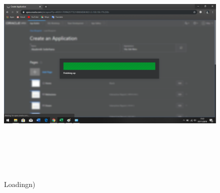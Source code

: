\documentclass[a4, 13pt]{article}
\begin{document}
     \begin{figure}[!htbp]
        \centering
        \includegraphics[width=16cm, height=12cm]{pictures/L.png}
        \caption{Loadingn)}
        \label{fig:my_label}
    \end{figure}
    
\end{document}
